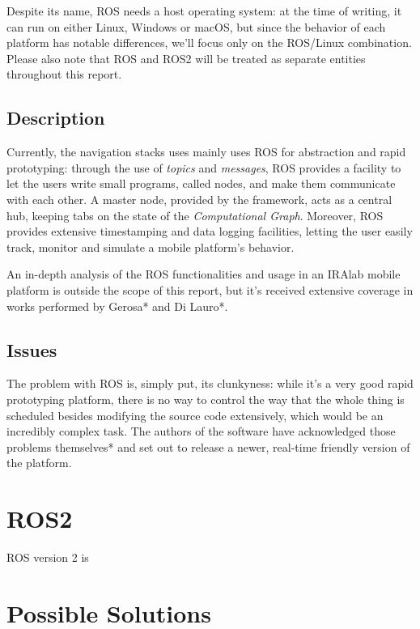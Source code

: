 \documentclass[a4paper,12pt]{report}
\begin{document}
Despite its name, ROS needs a host operating system: at the time of
writing, it can run on either Linux, Windows or macOS, but since the
behavior of each platform has notable differences, we'll focus only on
the ROS/Linux combination. Please also note that ROS and ROS2 will
be treated as separate entities throughout this report.

\subsection{Description}

Currently, the navigation stacks uses mainly uses ROS for abstraction
and rapid prototyping: through the use of \textit{topics} and
\textit{messages}, ROS provides a facility to let the users write
small programs, called nodes, and make them communicate with each
other. A master node, provided by the framework, acts as a central
hub, keeping tabs on the state of the \textit{Computational
  Graph}. Moreover, ROS provides extensive timestamping and data
logging facilities, letting the user easily track, monitor and
simulate a mobile platform's behavior.

An in-depth analysis of the ROS functionalities and usage in an IRAlab
mobile platform is outside the scope of this report, but it's received
extensive coverage in works performed by Gerosa* and Di Lauro*.

\subsection{Issues}

The problem with ROS is, simply put, its clunkyness: while it's a very
good rapid prototyping platform, there is no way to control the way
that the whole thing is scheduled besides modifying the source code extensively,
which would be an incredibly complex task. The authors of the software have
acknowledged those problems themselves* and set out to release a newer,
real-time friendly version of the platform.


\section{ROS2}

ROS version 2 is

\section{Possible Solutions}
\end{document}
